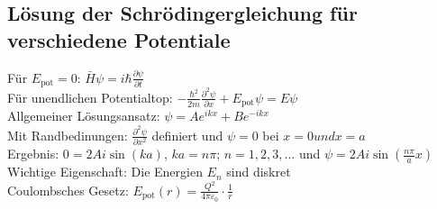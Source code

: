 \documentclass[fs, footer]{latex4ei}
\begin{document}
\begin{multicols*}{4}
\subsection{Lösung der Schrödingergleichung für verschiedene Potentiale}
Für $E_{\text{pot}} = 0$: $\bar H \psi = i\hbar \frac{\partial \psi}{\partial t}$\\
Für unendlichen Potentialtop: $ - \frac{\hbar^2}{2m}\frac{\partial^2 \psi}{\partial x} + E_{\text{pot}}\psi = E\psi$\\
Allgemeiner Lösungsansatz: $\psi = Ae^{ikx} + Be^{-ikx}$\\
Mit Randbedinungen: $\frac{\partial ^2 \psi}{\partial x^2}$ definiert und $\psi = 0$ bei $x=0 und x=a$\\

Ergebnis: $0 = 2Ai\sin(ka)$, $ka = n\pi$; $n = 1,2,3,...$ und $\psi = 2Ai\sin(\frac{n\pi}{a}x)$\\

Wichtige Eigenschaft: Die Energien $E_n$ sind diskret\\

Coulombsches Gesetz: $E_{\text{pot}}(r) = \frac{Q^2}{4\pi\varepsilon_0}\cdot\frac{1}{r}$\\

\end{multicols*}
\end{document}
